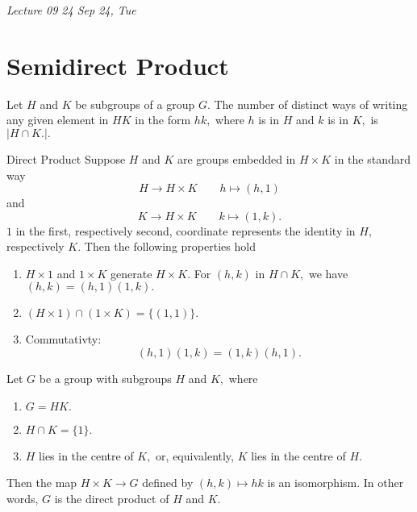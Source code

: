 \noindent
\emph{Lecture 09 \hfill 24 Sep 24, Tue}
\section{Semidirect Product}

\begin{proposition}\label{prop:number-of-representations}
	Let $H$ and $K$ be subgroups of a group $G.$ The number of distinct ways of
	writing any given element in $HK$ in the form $hk,$ where $h$ is in $H$ and $k$ 
	is in $K,$ is $ \lvert H \cap K. \rvert.$
\end{proposition}

Direct Product
Suppose $H$ and $K$ are groups embedded in $H \times K$ in the standard way
$$ H \to H \times  K \qquad h \mapsto (h,1) $$
and 
$$ K \to H \times  K \qquad k \mapsto (1,k) .$$
$1$ in the first, respectively second, coordinate represents the identity in $H,$
respectively $K.$
Then the following properties hold
\begin{enumerate}
	\item $H \times  1$ and $1 \times  K$ generate $ H \times  K.$
		For $(h, k )$ in $ H \cap K,$ we have $(h,k) = (h, 1) (1, k).$
	\item $ ( H \times 1) \cap (1 \times  K) = \{ ( 1, 1 ) \}.$
	\item Commutativty:
		$$(h,1) ( 1,k) = (1,k) (h,1).$$
\end{enumerate}

\begin{theorem}
	Let $G$ be a group with subgroups $H$ and $K,$ where
	\begin{enumerate}
		\item $G = H K.$
		\item $H \cap K = \{ 1 \}.$
		\item $H$ lies in the centre of $K,$ or, equivalently,
			$K$ lies in the centre of $H.$
	\end{enumerate}
	Then the map $ H \times K \to G$ defined by $(h, k) \mapsto hk$
	is an isomorphism. In other words, $G$ is the direct product of
	$H$ and $K.$
\end{theorem}

